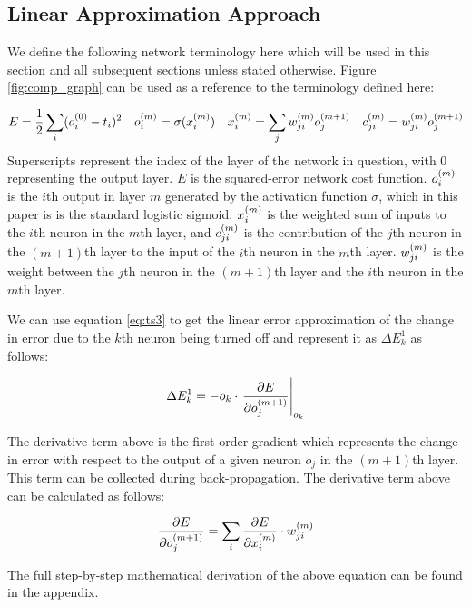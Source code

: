 \subsection{Linear Approximation Approach}

We define the following network terminology here which will be used in this section and all subsequent sections  unless stated otherwise. Figure \ref{fig:comp_graph} can be used as a reference to the terminology defined here:

\begin{align}
E &= \frac{1}{2}\sum\limits_i (o_{i}^{(0)} - t_{i})^2 &
o_{i}^{(m)} &= \sigma(x_{i}^{(m)}) &
x_{i}^{(m)} &= \sum\limits_j {w_{ji}^{(m)}}{ o_{j}^{(m + 1)}} &
c_{ji}^{(m)} = w_{ji}^{(m)} o_{j}^{(m+1)}\label{eq:term}
\end{align}
Superscripts represent the index of the layer of the network in question, with 0 representing the output layer. $E$ is the squared-error network cost function. $o_{i}^{(m)}$ is the $i$th output in layer $m$ generated by the activation function $\sigma$, which in this paper is is the standard logistic sigmoid. $x_{i}^{(m)}$ is the weighted sum of inputs to the $i$th neuron in the $m$th layer, and $c_{ji}^{(m)}$ is the contribution of the $j$th neuron in the $(m+1)$th layer to the input of the $i$th neuron in the $m$th layer. $w_{ji}^{(m)}$ is the weight between the $j$th neuron in the $(m+1)$th layer and the $i$th neuron in the $m$th layer.

We can use equation \ref{eq:ts3} to get the linear error approximation of the change in error due to the $k$th neuron being turned off and represent it as $\Delta E_{k}^1$ as follows:

\begin{align}
\Delta E_{k}^1 = - o_k\cdot \left.\pdv{E}{{o_{j}^{(m+1)}}}\right|_{o_k}
\end{align}

The derivative term above is the first-order gradient which represents the change in error with respect to the output of a given neuron $o_j$ in the $(m+1)$th layer. This term can be collected during back-propagation. The derivative term above can be calculated as follows:

\begin{align}
\pdv{E}{{o_{j}^{(m+1)}}} = \sum\limits_i \pdv{E}{x_{i}^{(m)}}\cdot w_{ji}^{(m)}
\end{align}

The full step-by-step mathematical derivation of the above equation can be found in the appendix.
